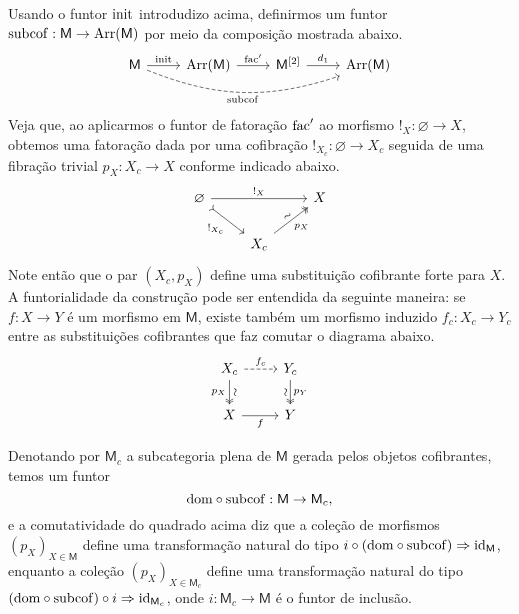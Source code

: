 \begin{obs}
  Usando o funtor $\mathrm{init}$ introdudizo acima, definirmos um funtor $\mathrm{subcof}: \mathsf{M} \to \mathrm{Arr}(\mathsf{M})$ por meio da composição mostrada abaixo.
  \begin{displaymath}
    \begin{tikzcd}
      \mathsf{M}
      \arrow[r, "\init"]
      \arrow[rrr, dashed, bend right=20, "\mathrm{subcof}" swap]
      & \Arr(\mathsf{M})
      \arrow[r, "\fac'"]
      & \mathsf{M}^{[2]}
      \arrow[r, "d_{1}"]
      & \Arr(\mathsf{M})
    \end{tikzcd}
  \end{displaymath}
  Veja que, ao aplicarmos o funtor de fatoração $\mathrm{fac}'$ ao morfismo $!_{X}: \varnothing \to X$, obtemos uma fatoração dada por uma cofibração $!_{X_{c}}: \varnothing \to X_{c}$ seguida de uma fibração trivial $p_{X}: X_{c} \to X$ conforme indicado abaixo.
  \begin{displaymath}
    \begin{tikzcd}
      \varnothing
      \arrow[rr, "!_{X}"]
      \arrow[rd, tail, "!_{X_{c}}" swap]
      & & X
      \\ & X_{c}
      \arrow[ru, two heads, "p_{X}" {swap}, "\sim" {sloped}]
    \end{tikzcd}
  \end{displaymath}
  Note então que o par $(X_{c},p_{X})$ define uma substituição cofibrante forte para $X$.
  A funtorialidade da construção pode ser entendida da seguinte maneira: se $f: X \to Y$ é um morfismo em $\mathsf{M}$, existe também um morfismo induzido $f_{c}: X_{c} \to Y_{c}$ entre as substituições cofibrantes que faz comutar o diagrama abaixo.
  \begin{equation}\label{eq:funtorialidade_substituicao_cofibrante}
    \begin{tikzcd}
      X_{c}
      \arrow[r, dashed, "f_{c}"]
      \arrow[d, two heads, "p_{X}" {swap}, "\sim" {sloped}]
      & Y_{c}
      \arrow[d, two heads, "p_{Y}", "\sim" {swap,sloped}]
      \\ X
      \arrow[r, "f" swap]
      & Y
    \end{tikzcd}
  \end{equation}

  Denotando por $\mathsf{M}_{c}$ a subcategoria plena de $\mathsf{M}$ gerada pelos objetos cofibrantes, temos um funtor
  \begin{displaymath}
    \mathrm{dom} \circ \mathrm{subcof}: \mathsf{M} \to \mathsf{M}_{c},
  \end{displaymath}
  e a comutatividade do quadrado acima diz que a coleção de morfismos $(p_{X})_{X \in \mathsf{M}}$ define uma transformação natural do tipo $i \circ (\mathrm{dom} \circ \mathrm{subcof}) \Rightarrow \mathrm{id}_{\mathsf{M}}$, enquanto a coleção $(p_{X})_{X \in \mathsf{M}_{c}}$ define uma transformação natural do tipo $(\mathrm{dom} \circ \mathrm{subcof}) \circ i \Rightarrow \mathrm{id}_{\mathsf{M}_{c}}$, onde $i: \mathsf{M}_{c} \to \mathsf{M}$ é o funtor de inclusão.


\end{obs}
